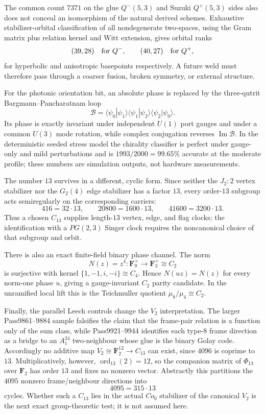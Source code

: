 The common count $7371$ on the glue $Q^-(5,3)$ and Suzuki $Q^+(5,3)$ sides also
does not conceal an isomorphism of the natural derived schemes.  Exhaustive
stabilizer-orbital classification of all nondegenerate two-spaces, using the
Gram matrix plus relation kernel and Witt extension, gives orbital ranks
\[
 (39,28)\quad\hbox{for }Q^- ,\qquad
 (40,27)\quad\hbox{for }Q^+,
\]
for hyperbolic and anisotropic basepoints respectively.  A future weld must
therefore pass through a coarser fusion, broken symmetry, or external structure.

For the photonic orientation bit, an absolute phase is replaced by the
three-qutrit Bargmann--Pancharatnam loop
\[
 \mathcal B=\langle\psi_0|\psi_1\rangle
 \langle\psi_1|\psi_2\rangle
 \langle\psi_2|\psi_0\rangle .
\]
Its phase is exactly invariant under independent $U(1)$ port gauges and under a
common $U(3)$ mode rotation, while complex conjugation reverses
$\operatorname{Im}\mathcal B$.  In the deterministic seeded stress model the
chirality classifier is perfect under gauge-only and mild perturbations and is
$1993/2000=99.65\%$ accurate at the moderate profile; these numbers are
simulation outputs, not hardware measurements.

The number $13$ survives in a different, cyclic form.  Since neither the
$J_2{:}2$ vertex stabilizer nor the $G_2(4)$ edge stabilizer has a factor $13$,
every order-$13$ subgroup acts semiregularly on the corresponding carriers:
\[
 416=32\cdot13,\qquad
 20800=1600\cdot13,\qquad
 41600=3200\cdot13.
\]
Thus a chosen $C_{13}$ supplies length-$13$ vertex, edge, and flag clocks; the
identification with a $PG(2,3)$ Singer clock requires the noncanonical choice of
that subgroup and orbit.

There is also an exact finite-field binary phase channel.  The norm
\[
 N(z)=z^4:\mathbf F_9^\times\longrightarrow\mathbf F_3^\times\cong C_2
\]
is surjective with kernel $\{1,-1,i,-i\}\cong C_4$.  Hence $N(uz)=N(z)$ for
every norm-one phase $u$, giving a gauge-invariant $C_2$ parity candidate.  In
the unramified local lift this is the Teichmuller quotient
$\mu_8/\mu_4\cong C_2$.

Finally, the parallel Leech controls change the $V_2$ interpretation.  The
larger Pass9861--9884 sample falsifies the claim that the frame-pair relation is
a function only of the sum class, while Pass9921--9944 identifies each type-$8$
frame direction as a bridge to an $A_1^{24}$ two-neighbour whose glue is the
binary Golay code.  Accordingly no additive map
$V_2\cong\mathbf F_2^{12}\to C_{13}$ can exist, since $4096$ is coprime to
$13$.  Multiplicatively, however,
$\operatorname{ord}_{13}(2)=12$, so the companion matrix of $\Phi_{13}$ over
$\mathbf F_2$ has order $13$ and fixes no nonzero vector.  Abstractly this
partitions the $4095$ nonzero frame/neighbour directions into
\[
 4095=315\cdot13
\]
cycles.  Whether such a $C_{13}$ lies in the actual $Co_0$ stabilizer of the
canonical $V_2$ is the next exact group-theoretic test; it is not assumed here.

